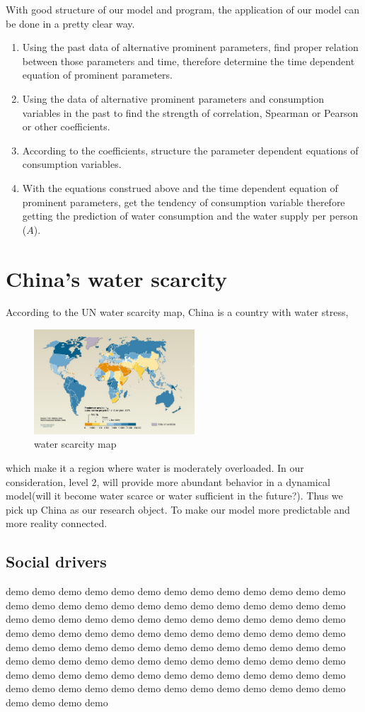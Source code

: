     With good structure of our model and program, the application of our model can be done in a pretty clear way.

    \begin{enumerate}[step 1]
      \item Using the past data of alternative prominent parameters, find proper relation between those parameters and time, therefore determine the time dependent equation of prominent parameters.
      \item Using the data of alternative prominent parameters and consumption variables in the past to find the strength of correlation, Spearman or Pearson or other coefficients.
      \item According to the coefficients, structure the parameter dependent equations of consumption variables.
      \item With the equations construed above and the time dependent equation of prominent parameters, get the tendency of consumption variable therefore getting the prediction of water consumption and the water supply per person ($A$).
    \end{enumerate}



\section{China's water scarcity}
  According to the UN water scarcity map, China is a country with water stress,
  \begin{figure}
  \includegraphics[width = 6cm]{picture/WaterScarcityMap.jpg}
  \caption{water scarcity map\cite{WaterScarcityMap}}
  \end{figure}
  which make it a region where water is moderately overloaded. In our consideration, level 2, will provide more abundant behavior in a dynamical model(will it become water scarce or water sufficient in the future?). Thus we pick up China as our research object. To make our model more predictable and more reality connected.
  \clearpage
  \subsection{Social drivers}
  demo demo demo demo demo demo demo demo demo demo demo demo demo demo demo demo demo demo demo demo demo demo demo demo demo demo demo demo demo demo demo demo demo demo demo demo demo demo demo demo demo demo demo demo demo demo demo demo demo demo demo demo demo demo demo demo demo demo demo demo demo demo demo demo demo demo demo demo demo demo demo demo demo demo demo demo demo demo demo demo demo demo demo demo demo demo demo demo demo demo demo demo demo demo demo demo demo demo demo demo demo demo demo demo demo demo demo demo
